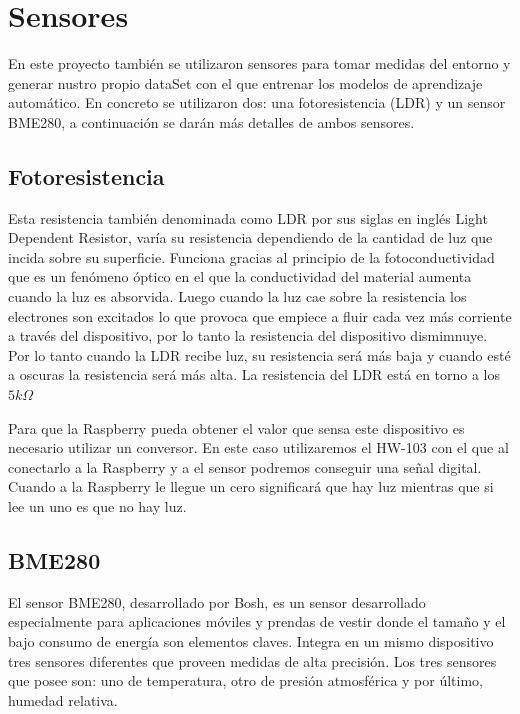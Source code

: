 \documentclass[a4paper, 12pt]{book}
\begin{document}
\section{Sensores}
\label{sec:sensores}

En este proyecto también se utilizaron sensores para tomar medidas del entorno y generar nustro propio dataSet con el que entrenar los modelos de aprendizaje automático. En concreto se utilizaron dos: una fotoresistencia (LDR) y un sensor BME280, a continuación se darán más detalles de ambos sensores.

\subsection{Fotoresistencia}
\label{subsec:fotoresistencia}

Esta resistencia también denominada como LDR por sus siglas en inglés Light Dependent Resistor, varía su resistencia dependiendo de la cantidad de luz que incida sobre su superficie. Funciona gracias al principio de la fotoconductividad que es un fenómeno óptico en el que la conductividad del material aumenta cuando la luz es absorvida. Luego cuando la luz cae sobre la resistencia los electrones son excitados lo que provoca que empiece a fluir cada vez más corriente a través del dispositivo, por lo tanto la resistencia del dispositivo dismimnuye. Por lo tanto cuando la LDR recibe luz, su resistencia será más baja y cuando esté a oscuras la resistencia será más alta. La resistencia del LDR está en torno a los $5 k\Omega$

Para que la Raspberry pueda obtener el valor que sensa este dispositivo es necesario utilizar un conversor. En este caso utilizaremos el HW-103 con el que al conectarlo a la Raspberry y a el sensor podremos conseguir una señal digital. Cuando a la Raspberry le llegue un cero significará que hay luz mientras que si lee un uno es que no hay luz.

\subsection{BME280}
\label{subsec:bme280}

El sensor BME280, desarrollado por Bosh, es un sensor desarrollado especialmente para aplicaciones móviles y prendas de vestir donde el tamaño y el bajo consumo de energía son elementos claves. Integra en un mismo dispositivo tres sensores diferentes que proveen medidas de alta precisión. Los tres sensores que posee son: uno de temperatura, otro de presión atmosférica y por último, humedad relativa. 
\end{document}
